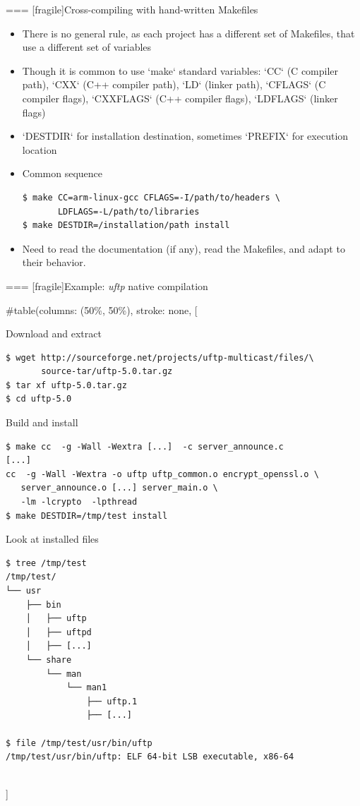 === [fragile]{Cross-compiling with hand-written Makefiles}
  \begin{itemize}
  \item There is no general rule, as each project has a different
    set of Makefiles, that use a different set of variables
  \item Though it is common to use `make` standard variables:
    `CC` (C compiler path), `CXX` (C++ compiler path),
    `LD` (linker path), `CFLAGS` (C compiler flags),
    `CXXFLAGS` (C++ compiler flags), `LDFLAGS` (linker
    flags)
  \item `DESTDIR` for installation destination, sometimes
    `PREFIX` for execution location
  \item Common sequence
    \begin{block}{}
      {
        \begin{verbatim}
$ make CC=arm-linux-gcc CFLAGS=-I/path/to/headers \
       LDFLAGS=-L/path/to/libraries
$ make DESTDIR=/installation/path install
        \end{verbatim}
      }
    \end{block}
  \item Need to read the documentation (if any), read the Makefiles,
    and adapt to their behavior.
  \end{itemize}


=== [fragile]{Example: {\em uftp} native compilation}
  
#table(columns: (50\%, 50\%), stroke: none,
[
  \begin{block}{Download and extract}
    {\tiny
\begin{verbatim}
$ wget http://sourceforge.net/projects/uftp-multicast/files/\
       source-tar/uftp-5.0.tar.gz
$ tar xf uftp-5.0.tar.gz
$ cd uftp-5.0
\end{verbatim}
    }
  \end{block}

  \begin{block}{Build and install}
    {\tiny
\begin{verbatim}
$ make cc  -g -Wall -Wextra [...]  -c server_announce.c
[...]
cc  -g -Wall -Wextra -o uftp uftp_common.o encrypt_openssl.o \
   server_announce.o [...] server_main.o \
   -lm -lcrypto  -lpthread
$ make DESTDIR=/tmp/test install
\end{verbatim}
    }
  \end{block}
    \column{0.5\textwidth}
  \begin{block}{Look at installed files}
    {\tiny
\begin{verbatim}
$ tree /tmp/test
/tmp/test/
└── usr
    ├── bin
    │   ├── uftp
    │   ├── uftpd
    │   ├── [...]
    └── share
        └── man
            └── man1
                ├── uftp.1
                ├── [...]

$ file /tmp/test/usr/bin/uftp
/tmp/test/usr/bin/uftp: ELF 64-bit LSB executable, x86-64
\end{verbatim}
    }
  \end{block}
\\]


